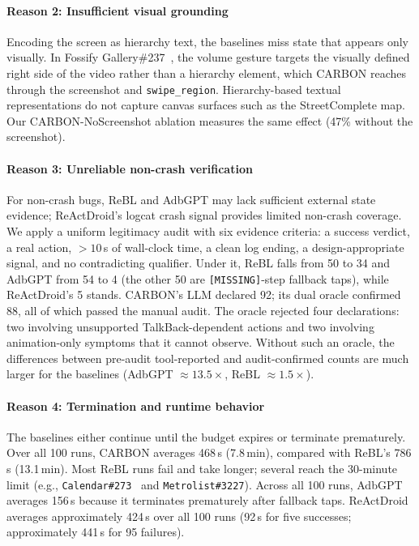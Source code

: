 \documentclass[10pt,conference,a4paper]{IEEEtran}
\begin{document}
  \paragraph{Reason 2: Insufficient visual grounding}
  Encoding the screen as hierarchy text, the baselines miss state that
  appears only visually. In Fossify Gallery\#237~\cite{gallery237}, the volume
  gesture targets the visually defined right side of the video rather than a
  hierarchy element, which CARBON reaches through the screenshot and
  \texttt{swipe\_region}. Hierarchy-based textual representations do not capture canvas surfaces such as the StreetComplete map. Our CARBON-NoScreenshot ablation measures the
  same effect (47\% without the screenshot).

  \paragraph{Reason 3: Unreliable non-crash verification}
  For non-crash bugs, ReBL and AdbGPT may lack sufficient external state
  evidence; ReActDroid's logcat crash signal provides limited non-crash
  coverage. We apply a uniform legitimacy audit with six evidence criteria: a
  success verdict, a real action, ${>}10$\,s of wall-clock time, a clean log
  ending, a design-appropriate signal, and no contradicting qualifier.
  Under it, ReBL falls from 50 to 34 and AdbGPT from 54 to 4 (the other
  50 are \texttt{[MISSING]}-step fallback taps), while ReActDroid's 5
  stands. CARBON's LLM declared 92; its dual oracle
  confirmed 88, all of which passed the manual audit. The oracle rejected four declarations: two involving unsupported TalkBack-dependent actions and two involving animation-only symptoms that it cannot observe. Without such an oracle, the differences between
  pre-audit tool-reported and audit-confirmed counts are much larger for the baselines
  (AdbGPT $\approx13.5\times$, ReBL $\approx1.5\times$).

  \paragraph{Reason 4: Termination and runtime behavior}
  The baselines either continue until the budget expires or terminate
  prematurely. Over all 100 runs, CARBON averages 468\,s (7.8\,min),
  compared with ReBL's 786\,s (13.1\,min). Most ReBL runs fail and take
  longer; several reach the 30-minute limit (e.g.,
  \texttt{Calendar\#273}~\cite{fossifycal273} and
  \texttt{Metrolist\#3227}).
  Across all 100 runs, AdbGPT averages 156\,s because it terminates
  prematurely after fallback taps. ReActDroid averages approximately
  424\,s over all 100 runs (92\,s for five successes; approximately
  441\,s for 95 failures).
\end{document}
